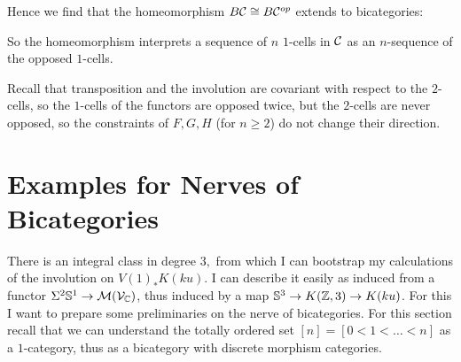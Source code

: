 Hence we find that the homeomorphism $B\mathcal{C} \cong B\mathcal{C}^{op}$ extends
to bicategories:

{}

So the homeomorphism interprets a sequence of $n$ $1$-cells in $\mathcal{C}$
as an $n$-sequence of the opposed $1$-cells.

{}

Recall that transposition and the involution are 
covariant with respect to the $2$-cells, so the $1$-cells of the functors are 
opposed twice, but the $2$-cells are never opposed, so the constraints 
of $F,G,H$ (for $n\geq 2$) do not change their direction.

{}

\section{Examples for Nerves of Bicategories}
There is an integral class in degree $3,$ from which I can bootstrap my 
calculations of the involution on $V(1)_*K(ku)$. I can describe it
easily as induced from a functor $\Sigma^2\mathbb{S}^1\rightarrow
\mathcal{M}(\mathcal{V}_{\mathbb{C}})$, thus induced by a map $\mathbb{S}^3\rightarrow K(\mathbb{Z},3)
\rightarrow K(ku)$. For this I want to prepare some preliminaries on
the nerve of bicategories. For this section recall that we
can understand the totally ordered set $[n]=[0<1<\ldots<n]$ as a 
$1$-category, thus as a bicategory with discrete morphism categories.

